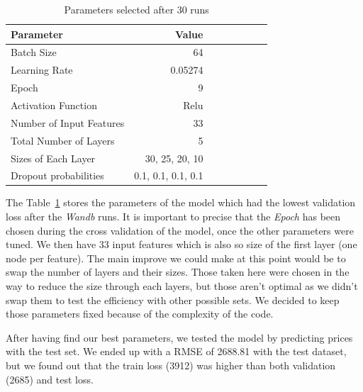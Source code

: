 \documentclass[12pt]{article}
\begin{document}
\FloatBarrier
\begin{table}[h]
    \centering
    \caption{Parameters selected after 30 runs}
    \label{table:Parameters of the best MLP model}

    \begin{tabular}{lrrrrrrr}
    \toprule
          Parameter & Value \\
    \midrule
    Batch Size & 64\\
    Learning Rate & 0.05274\\
    Epoch & 9\\
    Activation Function & Relu \\
    Number of Input Features & 33 \\
    Total Number of Layers & 5 \\
    Sizes of Each Layer & 30, 25, 20, 10 \\
    Dropout probabilities & 0.1, 0.1, 0.1, 0.1 \\
    \bottomrule
    \end{tabular}
\end{table}
\FloatBarrier

\noindent The Table~\ref{table:Parameters of the best MLP model} stores the parameters of the model which had the lowest validation loss after the \textit{Wandb} runs. It is important to precise that the \textit{Epoch} has been chosen during the cross validation of the model, once the other parameters were tuned. We then have 33 input features which is also so size of the first layer (one node per feature). The main improve we could make at this point would be to swap the number of layers and their sizes. Those taken here were chosen in the way to reduce the size through each layers, but those aren't optimal as we didn't swap them to test the efficiency with other possible sets. We decided to keep those parameters fixed because of the complexity of the code. 

\noindent After having find our best parameters, we tested the model by predicting prices with the test set. We ended up with a RMSE of 2688.81 with the test dataset, but we found out that the train loss (3912) was higher than both validation (2685) and test loss.
\end{document}
